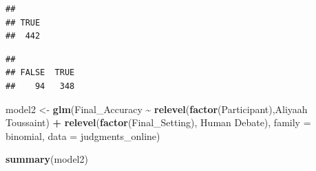 \documentclass[
]{article}
\newenvironment{Shaded}{\begin{snugshade}}{\end{snugshade}}
\newcommand{\AttributeTok}[1]{\textcolor[rgb]{0.13,0.29,0.53}{#1}}
\newcommand{\FunctionTok}[1]{\textcolor[rgb]{0.13,0.29,0.53}{\textbf{#1}}}
\newcommand{\NormalTok}[1]{#1}
\newcommand{\OtherTok}[1]{\textcolor[rgb]{0.56,0.35,0.01}{#1}}
\newcommand{\SpecialCharTok}[1]{\textcolor[rgb]{0.81,0.36,0.00}{\textbf{#1}}}
\newcommand{\StringTok}[1]{\textcolor[rgb]{0.31,0.60,0.02}{#1}}
\begin{document}
\begin{verbatim}
## 
## TRUE 
##  442
\end{verbatim}

\begin{Shaded}
\end{Shaded}

\begin{verbatim}
## 
## FALSE  TRUE 
##    94   348
\end{verbatim}

\begin{Shaded}
\begin{Highlighting}[]
\NormalTok{model2 }\OtherTok{\textless{}{-}} \FunctionTok{glm}\NormalTok{(Final\_Accuracy }\SpecialCharTok{\textasciitilde{}} \FunctionTok{relevel}\NormalTok{(}\FunctionTok{factor}\NormalTok{(Participant),}\StringTok{\textquotesingle{}Aliyaah Toussaint\textquotesingle{}}\NormalTok{) }\SpecialCharTok{+} \FunctionTok{relevel}\NormalTok{(}\FunctionTok{factor}\NormalTok{(Final\_Setting), }\StringTok{\textquotesingle{}Human Debate\textquotesingle{}}\NormalTok{), }\AttributeTok{family =} \StringTok{\textquotesingle{}binomial\textquotesingle{}}\NormalTok{, }\AttributeTok{data =}\NormalTok{ judgments\_online)}

\FunctionTok{summary}\NormalTok{(model2)}
\end{Highlighting}
\end{Shaded}
\end{document}
